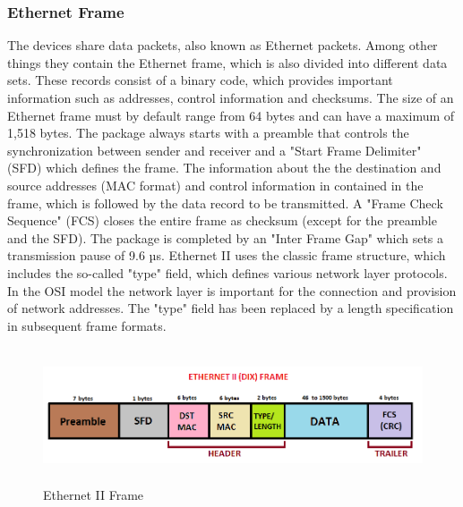\documentclass{article}
\begin{document}
\subsubsection{Ethernet Frame}
The devices share data packets, also known as Ethernet packets. Among other things they contain the Ethernet frame, which is also divided into different data sets. These records consist of a binary code, which provides important information such as addresses, control information and checksums.
\newline
\newline
The size of an Ethernet frame must by default range from 64 bytes and can have a maximum of 1,518 bytes. The package always starts with a preamble that controls the synchronization between sender and receiver and a "Start Frame Delimiter" (SFD) which defines the frame. 
\newline
\newline
The information about the the destination and source addresses (MAC format) and control information in contained in the frame, which is followed by the data record to be transmitted. A "Frame Check Sequence" (FCS) closes the entire frame as checksum (except for the preamble and the SFD). The package is completed by an "Inter Frame Gap" which sets a transmission pause of 9.6 µs.
\newline
\newline
Ethernet II uses the classic frame structure, which includes the so-called "type" field, which defines various network layer protocols. In the OSI model the network layer is important for the connection and provision of network addresses. The "type" field has been replaced by a length specification in subsequent frame formats.

\begin{figure}[h]    
    \centering
    \includegraphics[width=13cm, height=4cm,center]{images/ethernet_frame}
    \caption{Ethernet II Frame}
\end{figure}
\end{document}
